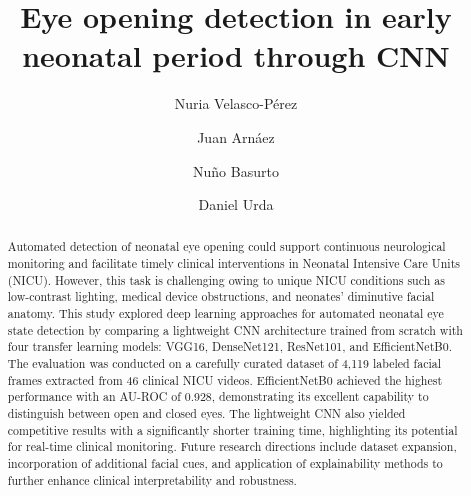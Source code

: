 \documentclass[runningheads]{llncs}
\begin{document}
%
\title{Eye opening detection in early neonatal period through CNN}
%
%
\author{Nuria Velasco-P{\'e}rez \and 
Juan Arnáez  \and
Nuño Basurto  \and
Daniel Urda 
}
%
%
%
\maketitle              %
%
\begin{abstract}
Automated detection of neonatal eye opening could support continuous neurological monitoring and facilitate timely clinical interventions in Neonatal Intensive Care Units (NICU). However, this task is challenging owing to unique NICU conditions such as low-contrast lighting, medical device obstructions, and neonates' diminutive facial anatomy. This study explored deep learning approaches for automated neonatal eye state detection by comparing a lightweight CNN architecture trained from scratch with four transfer learning models: VGG16, DenseNet121, ResNet101, and EfficientNetB0. The evaluation was conducted on a carefully curated dataset of 4,119 labeled facial frames extracted from 46 clinical NICU videos. EfficientNetB0 achieved the highest performance with an AU-ROC of 0.928, demonstrating its excellent capability to distinguish between open and closed eyes. The lightweight CNN also yielded competitive results with a significantly shorter training time, highlighting its potential for real-time clinical monitoring. Future research directions include dataset expansion, incorporation of additional facial cues, and application of explainability methods to further enhance clinical interpretability and robustness.
\end{abstract}
%
\end{document}

